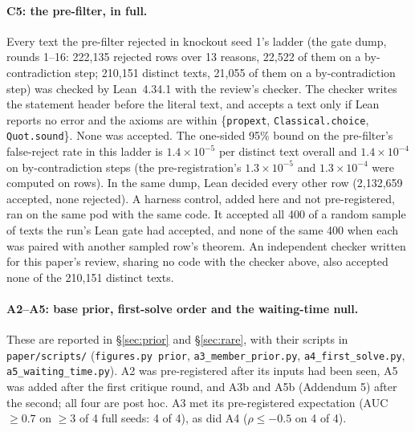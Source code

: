 \paragraph{C5: the pre-filter, in full.} Every text the pre-filter rejected in knockout seed 1's ladder (the gate dump,
rounds 1--16: \rv{} 222,135 rejected rows over 13 reasons, 22,522 of them on a by-contradiction step; 210,151 distinct
texts, 21,055 of them on a by-contradiction step) was checked by Lean~4.34.1 with
the review's checker. The checker writes the statement header before the literal text, and accepts a text only if Lean
reports no error and the axioms are within \{\texttt{propext}, \texttt{Classical.choice}, \texttt{Quot.sound}\}. None
was accepted. The one-sided 95\% bound on the pre-filter's false-reject rate in this ladder is \rv{} $1.4\times10^{-5}$ per
distinct text overall and $1.4\times10^{-4}$ on by-contradiction steps (the pre-registration's $1.3\times10^{-5}$ and
$1.3\times10^{-4}$ were computed on rows). In the same dump, Lean decided every other \rv{} row
(2,132,659 accepted, none rejected). A harness control, added here and not pre-registered, ran on the same pod with the
same code. It accepted all 400 of a random sample of texts the run's Lean gate had accepted, and none of the same 400
when each was paired with another sampled row's theorem. \rv{} An independent checker written for this paper's review,
sharing no code with the checker above, also accepted none of the 210,151 distinct texts.

\paragraph{A2--A5: base prior, first-solve order and the waiting-time null.} These are reported in \S\ref{sec:prior}
and \S\ref{sec:rare}, with their scripts in \texttt{paper/scripts/} (\texttt{figures.py prior},
\texttt{a3\_member\_prior.py}, \texttt{a4\_first\_solve.py}, \texttt{a5\_waiting\_time.py}). A2 was pre-registered
after its inputs had been seen, A5 was added after the first critique round, and A3b and A5b (Addendum 5) after the
second; all four are post hoc. A3 met its
pre-registered expectation (AUC $\geq 0.7$ on $\geq 3$ of 4 full seeds: 4 of 4), as did A4 ($\rho \leq -0.5$ on 4 of 4).
